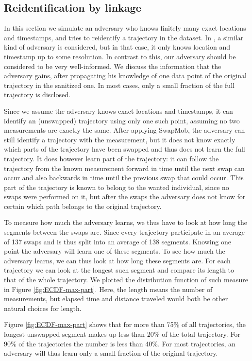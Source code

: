 \documentclass{llncs}
\begin{document}
\subsection{Reidentification by linkage}
\label{sec:reidentification}
In this section we simulate an adversary who knows finitely many exact locations and
timestamps, and tries to reidentify a trajectory in the dataset. In
\cite{demontjoye2013}, a similar kind of adversary is considered, but
in that case, it only knows location and timestamp up to some
resolution. In contrast to this, our adversary should be considered to
be very well-informed. We discuss the information that the adversary gains, after propagating his knowledge of one data point of the original trajectory in the sanitized one. In most cases, only a small fraction of the full trajectory is disclosed.

Since we assume the adversary knows exact locations and timestamps, it
can identify an (unswapped) trajectory using only one such point,
assuming no two measurements are exactly the same. After applying
SwapMob, the adversary can still identify a trajectory with the
measurement, but it does not know exactly which parts of the trajectory
have been swapped and thus does not learn the full trajectory. It does
however learn part of the trajectory: it can follow the trajectory
from the known measurement forward in time until the next swap can
occur and also backwards in time until the previous swap that could
occur. This part of the trajectory is known to belong to the wanted
individual, since no swaps were performed on it, but after the swaps
the adversary does not know for certain which path belongs to the
original trajectory.

To measure how much the adversary learns, we thus have to look at how
long the segments between the swaps are. Since every trajectory
participate in an average of 137 swaps and is thus split into an
average of 138 segments. Knowing one point the adversary will learn
one of these segments. To see how much the adversary learns, we can
thus look at how long these segments are. For each trajectory we can
look at the longest such segment and compare its length to that of the
whole trajectory. We plotted the distribution function of such measure in Figure \ref{fig:ECDF-max-part}. Here, the length means the number of
measurements, but elapsed time and distance traveled would both be
other natural choices for length.

Figure \ref{fig:ECDF-max-part} shows that for more than 75\% of all
trajectories, the longest unswapped segment makes up less than 20\% of
the total trajectory. For 90\% of the trajectories the number is less
than 40\%. For most trajectories, an adversary will thus learn only a
small fraction of the original trajectory.
\end{document}

